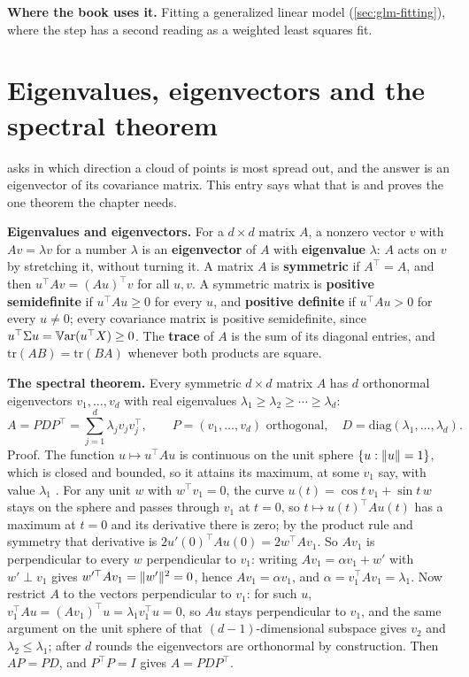 \textbf{Where the book uses it.} Fitting a generalized linear model (\cref{sec:glm-fitting}), where the step has a second reading as a weighted least squares fit.

\section{Eigenvalues, eigenvectors and the spectral theorem}
\label{sec:math-eigen}

 asks in which direction a cloud of points is most spread out, and the answer is an eigenvector of its covariance matrix.
This entry says what that is and proves the one theorem the chapter needs.

\textbf{Eigenvalues and eigenvectors.} For a $d \times d$ matrix $A$, a nonzero vector $v$ with $Av = \lambda v$ for a number $\lambda$ is an \textbf{eigenvector} of $A$ with \textbf{eigenvalue} $\lambda$: $A$ acts on $v$ by stretching it, without turning it.
A matrix $A$ is \textbf{symmetric} if $A^\top = A$, and then $u^\top Av = (Au)^\top v$ for all $u, v$.
A symmetric matrix is \textbf{positive semidefinite} if $u^\top Au \geq 0$ for every $u$, and \textbf{positive definite} if $u^\top Au > 0$ for every $u \neq 0$; every covariance matrix is positive semidefinite, since $u^\top\Sigma u = \operatorname*{\mathbb{V}\text{ar}}(u^\top X) \geq 0$.
The \textbf{trace} of $A$ is the sum of its diagonal entries, and $\mathrm{tr}(AB) = \mathrm{tr}(BA)$ whenever both products are square.

\textbf{The spectral theorem.} Every symmetric $d \times d$ matrix $A$ has $d$ orthonormal eigenvectors $v_1, \ldots, v_d$ with real eigenvalues $\lambda_1 \geq \lambda_2 \geq \cdots \geq \lambda_d$:
\[
A = PDP^\top = \sum_{j=1}^d \lambda_j v_jv_j^\top, \qquad P = (v_1, \ldots, v_d) \text{ orthogonal}, \quad D = \mathrm{diag}(\lambda_1, \ldots, \lambda_d).
\]
Proof. The function $u \mapsto u^\top Au$ is continuous on the unit sphere $\{u : \lVert u\rVert = 1\}$, which is closed and bounded, so it attains its maximum, at some $v_1$ say, with value $\lambda_1$ .
For any unit $w$ with $w^\top v_1 = 0$, the curve $u(t) = \cos t\,v_1 + \sin t\,w$ stays on the sphere and passes through $v_1$ at $t = 0$, so $t \mapsto u(t)^\top Au(t)$ has a maximum at $t = 0$ and its derivative there is zero; by the product rule and symmetry that derivative is $2u'(0)^\top Au(0) = 2w^\top Av_1$. So $Av_1$ is perpendicular to every $w$ perpendicular to $v_1$: writing $Av_1 = \alpha v_1 + w'$ with $w' \perp v_1$ gives $w'^\top Av_1 = \lVert w'\rVert^2 = 0$, hence $Av_1 = \alpha v_1$, and $\alpha = v_1^\top Av_1 = \lambda_1$.
Now restrict $A$ to the vectors perpendicular to $v_1$: for such $u$, $v_1^\top Au = (Av_1)^\top u = \lambda_1v_1^\top u = 0$, so $Au$ stays perpendicular to $v_1$, and the same argument on the unit sphere of that $(d-1)$-dimensional subspace gives $v_2$ and $\lambda_2 \leq \lambda_1$; after $d$ rounds the eigenvectors are orthonormal by construction.
Then $AP = PD$, and $P^\top P = I$ gives $A = PDP^\top$.

